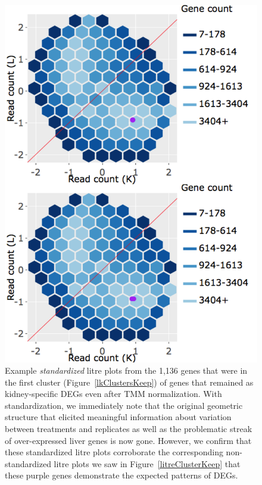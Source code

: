 \documentclass[11pt,a4paper,oldfontcommands,openany]{memoir}
\numberwithin{equation}{section} %
\begin{document}
\null
\begin{figure}[t!]
\begin{framed}
\centerline{\includegraphics[width=0.7\columnwidth]{MakeFigures/Dashboards/litreClusterKeep-St/litreClusterKeep-St.jpg}}
\end{framed}
\caption{Example \textit{standardized} litre plots from the 1,136 genes that were in the first cluster (Figure~\ref{lkClustersKeep}) of genes that remained as kidney-specific DEGs even after TMM normalization. With standardization, we immediately note that the original geometric structure that elicited meaningful information about variation between treatments and replicates as well as the problematic streak of over-expressed liver genes is now gone. However, we confirm that these standardized litre plots corroborate the corresponding non-standardized litre plots we saw in Figure~\ref{litreClusterKeep} that these purple genes demonstrate the expected patterns of DEGs.
\label{litreClusterKeep-St}}
\end{figure}
\end{document}
